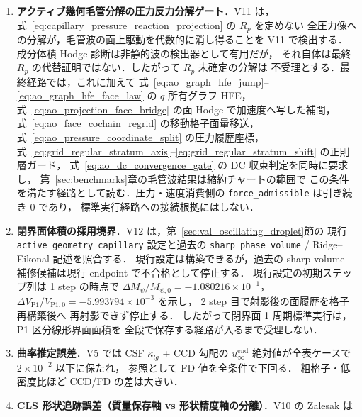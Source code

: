 \begin{enumerate}
        $C_wP_w=0$，計量自己随伴性，制限 Green 恒等式，および
        壁/周期壁商空間の階数条件を丸め誤差まで確認したため，
        V6/V7/V9 の圧力ジャンプ/HFE 統合診断はこの単体条件の上で読む．
        ただし U11 は小型代数条件であり，周期壁の有限振幅物理応答を
        第13章に追加するものではない．
  \item \textbf{アクティブ幾何毛管分解の圧力反力分解ゲート}．V11 は，
        式~\eqref{eq:capillary_pressure_reaction_projection} の $R_p$ を定めない
        全圧力像への分解が，毛管波の面上駆動を代数的に消し得ることを
        V11 で検出する．成分体積 Hodge 診断は非静的波の検出器として有用だが，
        それ自体は最終 $R_p$ の代替証明ではない．したがって $R_p$ 未確定の分解は
        不受理とする．最終経路では，これに加えて
        式~\eqref{eq:ao_graph_hfe_jump}--\eqref{eq:ao_graph_hfe_face_law} の
        $q$ 所有グラフ HFE，
        式~\eqref{eq:ao_projection_face_bridge} の面 Hodge で加速度へ写した補間，
        式~\eqref{eq:ao_face_cochain_regrid} の移動格子面量移送，
        式~\eqref{eq:ao_pressure_coordinate_split} の圧力履歴座標，
        式~\eqref{eq:grid_regular_stratum_axis}--\eqref{eq:grid_regular_stratum_shift}
        の正則層ガード，
        式~\eqref{eq:ao_dc_convergence_gate} の DC 収束判定を同時に要求し，
        第~\ref{sec:benchmarks}章の毛管波結果は縮約チャートの範囲で
        この条件を満たす経路として読む．圧力・速度消費側の
        \texttt{force\_admissible} は引き続き $0$ であり，
        標準実行経路への接続根拠にはしない．
  \item \textbf{閉界面体積の採用境界}．V12 は，第~\ref{sec:val_oscillating_droplet}節の
        現行 \texttt{active\_geometry\_capillary} 設定と過去の
        \texttt{sharp\_phase\_volume} / Ridge--Eikonal 記述を照合する．
        現行設定は構築できるが，過去の sharp-volume 補修候補は現行 endpoint で不合格として停止する．
        現行設定の初期ステップ列は 1 step の時点で
        $\Delta M_\psi/M_{\psi,0}=-1.080216\times10^{-1}$，
        $\Delta V_{\mathrm{P1}}/V_{\mathrm{P1},0}=-5.993794\times10^{-3}$ を示し，
        2 step 目で射影後の面履歴を格子再構築後へ
        再射影できず停止する．
        したがって閉界面 1 周期標準実行は，P1 区分線形界面面積を
        全段で保存する経路が入るまで受理しない．
  \item \textbf{曲率推定誤差}．V5 では CSF $\kappa_{lg}$ + CCD 勾配の
        $u_\infty^{\mathrm{end}}$ 絶対値が全表ケースで $2\times10^{-2}$ 以下に保たれ，
        参照として FD 値を全条件で下回る．
        粗格子・低密度比ほど CCD/FD の差は大きい．
  \item \textbf{CLS 形状追跡誤差（質量保存軸 vs 形状精度軸の分離）}．V10 の Zalesak は

\end{enumerate}
